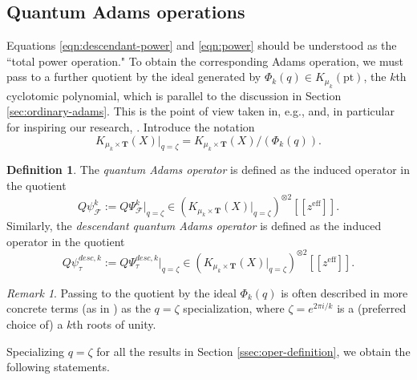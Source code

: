\documentclass[reqno]{amsart}
\numberwithin{equation}{section}
\numberwithin{equation}{section}
\numberwithin{equation}{section}
\theoremstyle{definition}
\newtheorem{defn}[thm]{Definition}
\theoremstyle{remark}
\theoremstyle{remark}
\newtheorem{rem}[thm]{Remark}
\begin{document}
\subsection{Quantum Adams operations}\label{ssec:qAdams}
Equations \eqref{eqn:descendant-power} and \eqref{eqn:power} should be understood as the ``total power operation."  To obtain the corresponding Adams operation, we must pass to a further quotient by the ideal generated by $\Phi_k(q) \in K_{\mu_k}(\mathrm{pt})$, the $k$th cyclotomic polynomial, which is parallel to the discussion in Section \ref{sec:ordinary-adams}. This is the point of view taken in, e.g., \cite{atiyah-power} and, in particular for inspiring our research, \cite[Section 4]{lonergan}. Introduce the notation
\begin{equation}
    K_{\mu_k \times \mathbf{T}}(X) |_{q = \zeta} = K_{\mu_k \times \mathbf{T}}(X) / (\Phi_k(q)).
\end{equation}

\begin{defn}
    The \emph{quantum Adams operator} is defined as the induced operator in the quotient
    \begin{equation}
        Q\psi_{\mathcal{F}}^k := Q\Psi_{\mathcal{F}}^k |_{q = \zeta} \in \left( K_{\mu_k \times \mathbf{T}}(X)|_{q = \zeta} \right)^{\otimes 2} [\![z ^{\mathrm{eff}} ]\!].
    \end{equation}
    Similarly, the \emph{descendant quantum Adams operator} is defined as the induced operator in the quotient 
    \begin{equation}
        Q\psi_{\tau}^{desc,k} := Q\Psi_{\tau}^{desc,k} |_{q = \zeta} \in \left( K_{\mu_k \times \mathbf{T}}(X)|_{q = \zeta} \right)^{\otimes 2} [\![z ^{\mathrm{eff}} ]\!].
    \end{equation}
\end{defn}

\begin{rem}
    Passing to the quotient by the ideal $\Phi_k(q)$ is often described in more concrete terms (as in \cite{koroteev-smirnov}) as the $q = \zeta$ specialization, where $\zeta = e^{2\pi i/k}$ is a (preferred choice of) a $k$th roots of unity.
\end{rem}

Specializing $q=\zeta$ for all the results in Section \ref{ssec:oper-definition}, we obtain the following statements.
\end{document}
